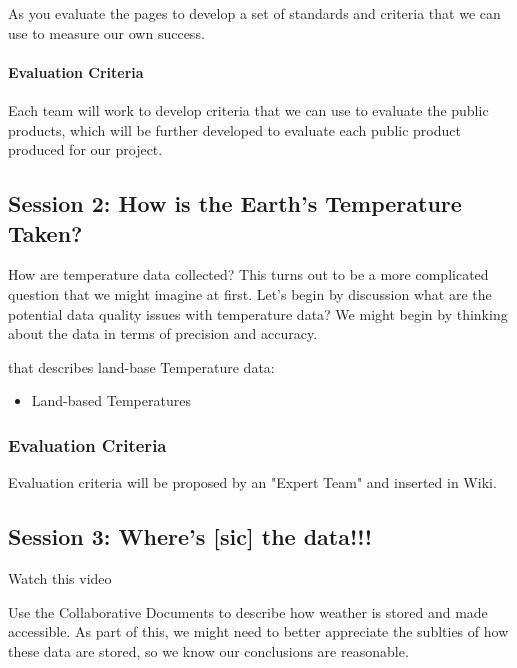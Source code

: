 \documentclass{article}\usepackage[]{graphicx}\usepackage[]{color}
\begin{document}
As you evaluate the pages to develop a set of standards and criteria that we can use to measure our own success.

\paragraph{Evaluation Criteria}

Each team will work to develop criteria that we can use to evaluate the public products, which will be further developed to evaluate each public product produced for our project.

\subsection{Session 2: How is the Earth's Temperature Taken?}

How are temperature data collected? This turns out to be a more complicated question that we might imagine at first. Let's begin by discussion what are the potential data quality issues with temperature data? We might begin by thinking about the data in terms of precision and accuracy.


that describes land-base Temperature data:

\begin{itemize}
  \item Land-based Temperatures
\end{itemize}

\subsubsection{Evaluation Criteria}

Evaluation criteria will be proposed by an "Expert Team" and inserted in Wiki. 

\subsection{Session 3: Where's [sic] the data!!!}

Watch this video

Use the Collaborative Documents to describe how weather is stored and made accessible. As part of this, we might need to better appreciate the sublties of how these data are stored, so we know our conclusions are reasonable.
\end{document}
